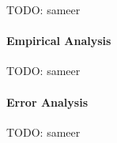 TODO: sameer

\paragraph{Empirical Analysis}

TODO: sameer


\paragraph{Error Analysis}

TODO: sameer

